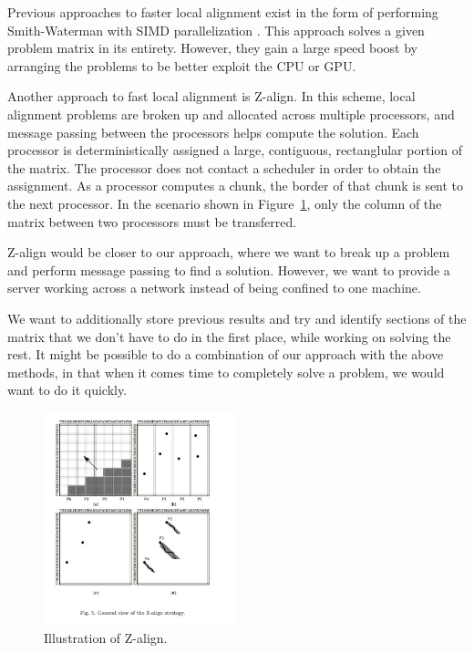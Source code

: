 \documentclass[12pt]{article}
\begin{document}
Previous approaches to faster local alignment exist in the form of performing Smith-Waterman with SIMD parallelization \cite{Rognes:11}. This approach solves a given problem matrix in its entirety. However, they gain a large speed boost by arranging the problems to be better exploit the CPU or GPU. 

Another approach to fast local alignment is Z-align\cite{Boukerche:12}. In this scheme, local alignment problems are broken up and allocated across multiple processors, and message passing between the processors helps compute the solution.
Each processor is deterministically assigned a large, contiguous, rectanglular portion of the matrix.
The processor does not contact a scheduler in order to obtain the assignment.
As a processor computes a chunk, the border of that chunk is sent to the next processor.
In the scenario shown in Figure~\ref{fig:z-align}, only the column of the matrix between two processors must be transferred.

Z-align would be closer to our approach, where we want to break up a problem and perform message passing to find a solution. However, we want to provide a server working across a network instead of being confined to one machine.  

We want to additionally store previous results and try and identify sections of the matrix that we don't have to do in the first place, while working on solving the rest. It might be possible to do a combination of our approach with the above methods, in that when it comes time to completely solve a problem, we would want to do it quickly.

\begin{figure}
  \centering 
  \includegraphics[width=0.5\textwidth]{ExistingWorkAllocationStrategies}
  \caption{Illustration of Z-align.\cite{Rognes:11}}
  \label{fig:z-align}
\end{figure}
\end{document}
